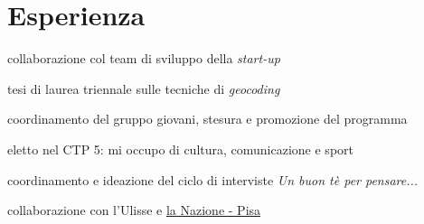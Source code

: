 \documentclass[a4paper]{deedy-resume} %
\begin{document}
\begin{minipage}[t]{0.66\textwidth} %


\section{Esperienza}



\vspace{\topsep} %
\begin{tightitemize}
\item collaborazione col team di sviluppo della \textit{start-up}
\item tesi di laurea triennale sulle tecniche di \textit{geocoding}
\end{tightitemize}

\sectionspace %



\begin{tightitemize}
\item coordinamento del gruppo giovani, stesura e promozione del programma
\item eletto nel CTP 5: mi occupo di cultura, comunicazione e sport
\end{tightitemize}

\sectionspace %



\begin{tightitemize}
\item coordinamento e ideazione del ciclo di interviste \textit{Un buon tè per pensare...}
\item collaborazione con l'Ulisse e \href{http://rassegnastampa.unipi.it/rassegna/archivio/2012/02/21SIG2034.PDF}{la Nazione - Pisa}
\end{tightitemize}


\end{minipage}
\end{document}
